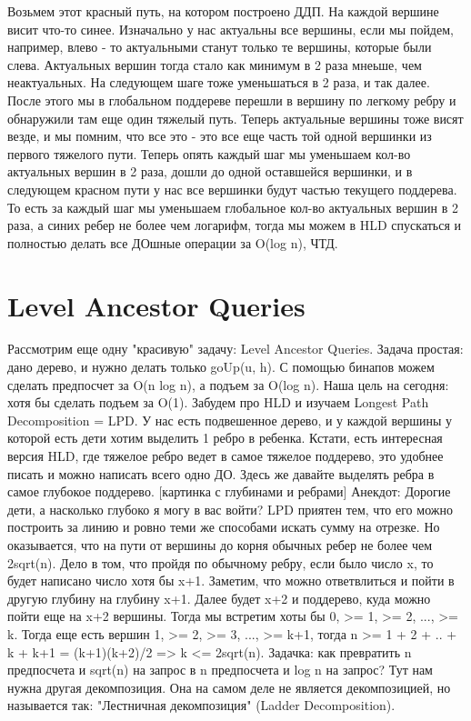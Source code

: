 Возьмем этот красный путь, на котором построено ДДП. На каждой вершине висит что-то синее. Изначально у нас актуальны все вершины, если мы пойдем, например, влево - то актуальными станут только те вершины, которые были слева. Актуальных вершин тогда стало как минимум в 2 раза мнеьше, чем неактуальных. На следующем шаге тоже уменьшаться в 2 раза, и так далее. После этого мы в глобальном поддереве перешли в вершину по легкому ребру и обнаружили там еще один тяжелый путь. Теперь актуальные вершины тоже висят везде, и мы помним, что все это - это все еще часть той одной вершинки из первого тяжелого пути. Теперь опять каждый шаг мы уменьшаем кол-во актуальных вершин в 2 раза, дошли до одной оставшейся вершинки, и в следующем красном пути у нас все вершинки будут частью текущего поддерева. То есть за каждый шаг мы уменьшаем глобальное кол-во актуальных вершин в 2 раза, а синих ребер не более чем логарифм, тогда мы можем в HLD спускаться и полностью делать все ДОшные операции за O(log n), ЧТД.




\section{Level Ancestor Queries}




Рассмотрим еще одну "красивую" задачу: Level Ancestor Queries. Задача простая: дано дерево, и нужно делать только goUp(u, h). С помощью бинапов можем сделать предпосчет за O(n log n), а подъем за O(log n). Наша цель на сегодня: хотя бы сделать подъем за O(1). Забудем про HLD и изучаем Longest Path Decomposition = LPD. У нас есть подвешенное дерево, и у каждой вершины у которой есть дети хотим выделить 1 ребро в ребенка. Кстати, есть интересная версия HLD, где тяжелое ребро ведет в самое тяжелое поддерево, это удобнее писать и можно написать всего одно ДО. Здесь же давайте выделять ребра в самое глубокое поддерево. [картинка с глубинами и ребрами]
Анекдот: Дорогие дети, а насколько глубоко я могу в вас войти?
LPD приятен тем, что его можно построить за линию и ровно теми же способами искать сумму на отрезке. Но оказывается, что на пути от вершины до корня обычных ребер не более чем 2sqrt(n). Дело в том, что пройдя по обычному ребру, если было число x, то будет написано число хотя бы x+1. Заметим, что можно ответвлиться и пойти в другую глубину на глубину x+1. Далее будет x+2 и поддерево, куда можно пойти еще на x+2 вершины. Тогда мы встретим хоты бы 0, >= 1, >= 2, ..., >= k. Тогда еще есть вершин 1, >= 2, >= 3, ..., >= k+1, тогда n >= 1 + 2 + .. + k + k+1 = (k+1)(k+2)/2 => k <= 2sqrt(n).
Задачка: как превратить n предпосчета и sqrt(n) на запрос в n предпосчета и log n на запрос? Тут нам нужна другая декомпозиция. Она на самом деле не является декомпозицией, но называется так: "Лестничная декомпозиция" (Ladder Decomposition).

